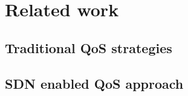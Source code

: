 \section{Related work}
\label{sect:related}
\subsection{Traditional QoS strategies}

\subsection{SDN enabled QoS approach}
